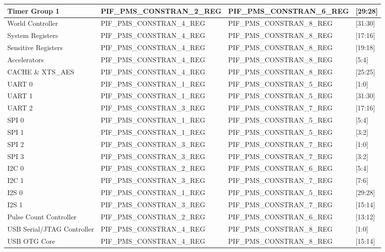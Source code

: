 \documentclass[main\_\_EN.tex]{subfiles}
\begin{document}
\begin{ThreePartTable}
\begin{longtable}[c]{ |l|l|l|l| }
    Timer Group 1 & PIF\_PMS\_CONSTRAN\_2\_REG & PIF\_PMS\_CONSTRAN\_6\_REG & [29:28] \\\hline
    World Controller & PIF\_PMS\_CONSTRAN\_4\_REG & PIF\_PMS\_CONSTRAN\_8\_REG & [31:30] \\\hline
    System Registers & PIF\_PMS\_CONSTRAN\_4\_REG & PIF\_PMS\_CONSTRAN\_8\_REG & [17:16] \\\hline
    Sensitive Registers & PIF\_PMS\_CONSTRAN\_4\_REG & PIF\_PMS\_CONSTRAN\_8\_REG & [19:18] \\\hline
    Accelerators\tnote{1} & PIF\_PMS\_CONSTRAN\_4\_REG & PIF\_PMS\_CONSTRAN\_8\_REG & [5:4] \\\hline
    CACHE \& XTS\_AES\tnote{2} & PIF\_PMS\_CONSTRAN\_4\_REG & PIF\_PMS\_CONSTRAN\_8\_REG & [25:25] \\\hline
    UART 0 & PIF\_PMS\_CONSTRAN\_1\_REG & PIF\_PMS\_CONSTRAN\_5\_REG & [1:0] \\\hline
    UART 1 & PIF\_PMS\_CONSTRAN\_1\_REG & PIF\_PMS\_CONSTRAN\_5\_REG & [31:30] \\\hline
    UART 2 & PIF\_PMS\_CONSTRAN\_3\_REG & PIF\_PMS\_CONSTRAN\_7\_REG & [17:16] \\\hline
    SPI 0 & PIF\_PMS\_CONSTRAN\_1\_REG & PIF\_PMS\_CONSTRAN\_5\_REG & [5:4] \\\hline
    SPI 1 & PIF\_PMS\_CONSTRAN\_1\_REG & PIF\_PMS\_CONSTRAN\_5\_REG & [3:2] \\\hline
    SPI 2 & PIF\_PMS\_CONSTRAN\_3\_REG & PIF\_PMS\_CONSTRAN\_7\_REG & [1:0] \\\hline
    SPI 3 & PIF\_PMS\_CONSTRAN\_3\_REG & PIF\_PMS\_CONSTRAN\_7\_REG & [3:2] \\\hline
    I2C 0 & PIF\_PMS\_CONSTRAN\_2\_REG & PIF\_PMS\_CONSTRAN\_6\_REG & [5:4] \\\hline
    I2C 1 & PIF\_PMS\_CONSTRAN\_3\_REG & PIF\_PMS\_CONSTRAN\_7\_REG & [7:6] \\\hline
    I2S 0 & PIF\_PMS\_CONSTRAN\_1\_REG & PIF\_PMS\_CONSTRAN\_5\_REG & [29:28] \\\hline
    I2S 1 & PIF\_PMS\_CONSTRAN\_3\_REG & PIF\_PMS\_CONSTRAN\_7\_REG & [15:14] \\\hline
    Pulse Count Controller & PIF\_PMS\_CONSTRAN\_2\_REG & PIF\_PMS\_CONSTRAN\_6\_REG & [13:12] \\\hline
    USB Serial/JTAG Controller & PIF\_PMS\_CONSTRAN\_4\_REG & PIF\_PMS\_CONSTRAN\_8\_REG & [1:0] \\\hline
    USB OTG Core & PIF\_PMS\_CONSTRAN\_4\_REG & PIF\_PMS\_CONSTRAN\_8\_REG & [15:14] \\\hline

\end{longtable}
\end{ThreePartTable}
\end{document}

